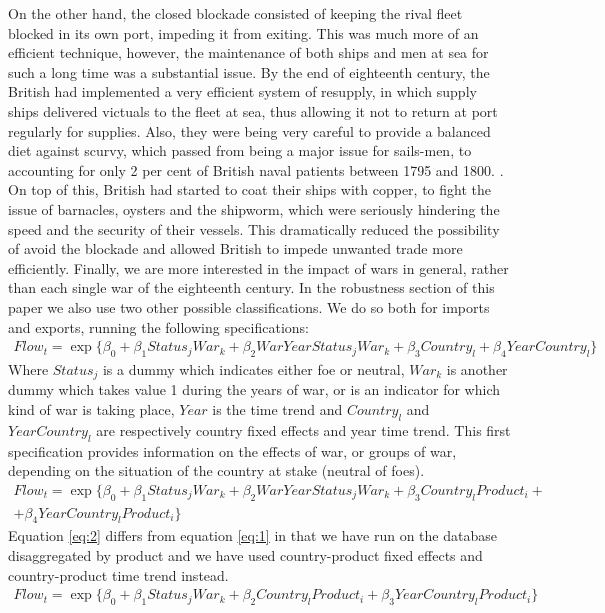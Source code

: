 \documentclass[12pt,a4paper,notitlepage,english]{article}
\begin{document}
On the other hand, the closed blockade consisted of keeping the rival fleet blocked in its own port, impeding it from exiting.
This was much more of an efficient technique, however, the maintenance of both ships and men at sea for such a long time was a substantial issue.
By the end of eighteenth century, the British had implemented a very efficient system of resupply, in which supply ships delivered victuals to the fleet at sea, thus allowing it not to return at port regularly for supplies.
Also, they were being very careful to provide a balanced diet against scurvy, which passed from being a major issue for sails-men, to accounting for only 2 per cent of British naval patients between 1795 and 1800.
\citep{rodger2005command}.
On top of this, British had started to coat their ships with copper, to fight the issue of barnacles, oysters and the shipworm, which were seriously hindering the speed and the security of their vessels.
This dramatically reduced the possibility of avoid the blockade and allowed British to impede unwanted trade more efficiently.
Finally, we are more interested in the impact of wars in general, rather than each single war of the eighteenth century.
In the robustness section of this paper we also use two other possible classifications.
We do so both for imports and exports, running the following specifications: 
\begin{multline}\label{eq:1}
Flow_{t}=\exp\{\beta_0+\beta_1Status_jWar_k + \beta_2WarYearStatus_jWar_k+\beta_3Country_l +\beta_4YearCountry_l\}
\end{multline}
Where $Status_j$ is a dummy which indicates either foe or neutral, $War_k$ is another dummy which takes value 1 during the years of war, or is an indicator for which kind of war is taking place, $Year$ is the time trend and $Country_l$ and $YearCountry_l$ are respectively country fixed effects and year time trend.
This first specification provides information on the effects of war, or groups of war, depending on the situation of the country at stake (neutral of foes).
\begin{multline}\label{eq:2}
Flow_{t}=\exp\{\beta_0+\beta_1Status_jWar_k + \beta_2WarYearStatus_jWar_k+\beta_3Country_lProduct_i +\\ +\beta_4YearCountry_lProduct_i\}
\end{multline}
Equation \ref{eq:2} differs from equation \ref{eq:1} in that we have run on the database disaggregated by product and we have used country-product fixed effects and country-product time trend instead.
\begin{multline}\label{eq:3}
Flow_{t}=\exp\{\beta_0+\beta_1Status_jWar_k + \beta_2Country_lProduct_i+\beta_3YearCountry_lProduct_i\}
\end{multline}
\end{document}
